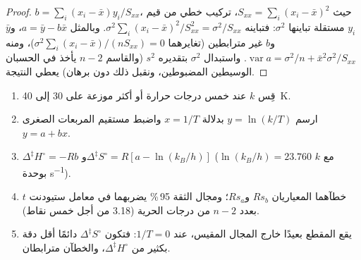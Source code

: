 \begin{proof}
$b = \sum_i(x_i - \bar x)y_i/S_{xx}$، حيث $S_{xx} = \sum_i(x_i - \bar x)^2$، تركيب خطي من
قيم $y_i$ مستقلة تباينها $\sigma^2$: فتباينه $\sigma^2\sum_i(x_i - \bar x)^2/S_{xx}^2 = \sigma^2/S_{xx}$.
وبالمثل $a = \bar y - b\bar x$، و$\bar y$ و$b$ غير مترابطين (تغايرهما
$\sigma^2\sum_i(x_i - \bar x)/(nS_{xx}) = 0$)، ومنه $\operatorname{var}a = \sigma^2/n + \bar x^2\sigma^2/S_{xx}$. واستبدال $\sigma^2$
بتقديره $s^2$ (والقاسم $n - 2$ يأخذ في الحسبان الوسيطين المضبوطين،
ونقبل ذلك دون برهان) يعطي النتيجة.
\end{proof}

\begin{method}\label{met:b3:rate-theories:eyring-plot}
\begin{enumerate}
  \item قِس $k$ عند خمس درجات حرارة أو أكثر موزعة على 30 إلى \qty{40}{K}.
  \item ارسم $y = \ln(k/T)$ بدلالة $x = 1/T$ واضبط مستقيم المربعات الصغرى $y = a + bx$.
  \item $\Delta^{\ddagger}H^\circ = -Rb$ و$\Delta^{\ddagger}S^\circ = R[a - \ln(k_B/h)]$ ($\ln(k_B/h) = 23.760$ مع $k$ بوحدة
        \unit{s^{-1}}).
  \item خطآهما المعياريان $Rs_b$ و$Rs_a$؛ ومجال الثقة 95\,\%
        يضربهما في معامل ستيودنت $t$ بعدد $n - 2$ من درجات الحرية (3.18 من أجل
        خمس نقاط).
  \item يقع المقطع بعيدًا خارج المجال المقيس، عند $1/T = 0$: فتكون $\Delta^{\ddagger}S^\circ$
        دائمًا أقل دقة بكثير من $\Delta^{\ddagger}H^\circ$، والخطآن
        مترابطان.
\end{enumerate}
\end{method}

